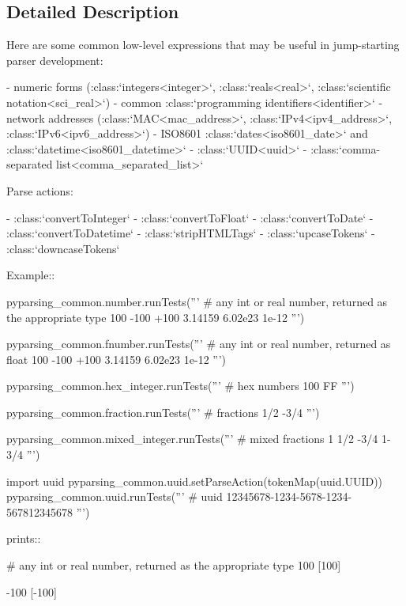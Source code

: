 \subsection{Detailed Description}
\begin{DoxyVerb}Here are some common low-level expressions that may be useful in
jump-starting parser development:

 - numeric forms (:class:`integers<integer>`, :class:`reals<real>`,
   :class:`scientific notation<sci_real>`)
 - common :class:`programming identifiers<identifier>`
 - network addresses (:class:`MAC<mac_address>`,
   :class:`IPv4<ipv4_address>`, :class:`IPv6<ipv6_address>`)
 - ISO8601 :class:`dates<iso8601_date>` and
   :class:`datetime<iso8601_datetime>`
 - :class:`UUID<uuid>`
 - :class:`comma-separated list<comma_separated_list>`

Parse actions:

 - :class:`convertToInteger`
 - :class:`convertToFloat`
 - :class:`convertToDate`
 - :class:`convertToDatetime`
 - :class:`stripHTMLTags`
 - :class:`upcaseTokens`
 - :class:`downcaseTokens`

Example::

    pyparsing_common.number.runTests('''
        # any int or real number, returned as the appropriate type
        100
        -100
        +100
        3.14159
        6.02e23
        1e-12
        ''')

    pyparsing_common.fnumber.runTests('''
        # any int or real number, returned as float
        100
        -100
        +100
        3.14159
        6.02e23
        1e-12
        ''')

    pyparsing_common.hex_integer.runTests('''
        # hex numbers
        100
        FF
        ''')

    pyparsing_common.fraction.runTests('''
        # fractions
        1/2
        -3/4
        ''')

    pyparsing_common.mixed_integer.runTests('''
        # mixed fractions
        1
        1/2
        -3/4
        1-3/4
        ''')

    import uuid
    pyparsing_common.uuid.setParseAction(tokenMap(uuid.UUID))
    pyparsing_common.uuid.runTests('''
        # uuid
        12345678-1234-5678-1234-567812345678
        ''')

prints::

    # any int or real number, returned as the appropriate type
    100
    [100]

    -100
    [-100]


\end{DoxyVerb}

